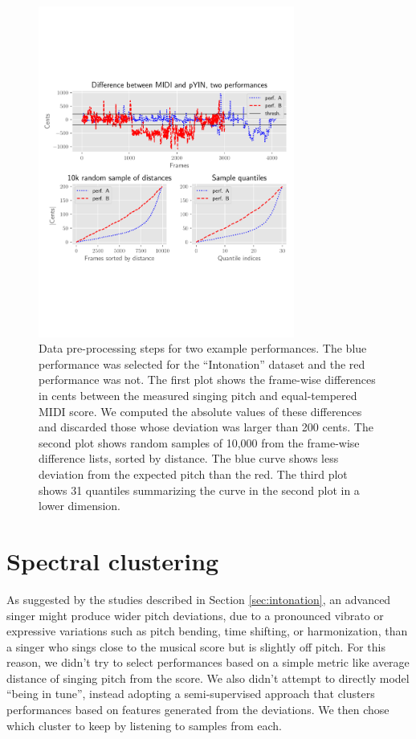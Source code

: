 \begin{appendices}
\begin{figure}[h!]
    \centering
    \includegraphics[width=0.75\textwidth]{figures/data_processing_pipeline.pdf}\vspace{-1in}
    \caption{Data pre-processing steps for two example performances. The blue performance was selected for the ``Intonation'' dataset and the red performance was not. The first plot shows the frame-wise differences in cents between the measured singing pitch and equal-tempered MIDI score. We computed the absolute values of these differences and discarded those whose deviation was larger than 200 cents. The second plot shows random samples of 10,000 from the frame-wise difference lists, sorted by distance. The blue curve shows less deviation from the expected pitch than the red. The third plot shows 31 quantiles summarizing the curve in the second plot in a lower dimension.}
    \label{fig:pipeline}
\end{figure}
\section{Spectral clustering}
As suggested by the studies described in Section \ref{sec:intonation}, an advanced singer might produce wider pitch deviations, due to a pronounced vibrato or expressive variations such as pitch bending, time shifting, or harmonization, than a singer who sings close to the musical score but is slightly off pitch. For this reason, we didn't try to select performances based on a simple metric like average distance of singing pitch from the score. We also didn't attempt to directly model ``being in tune'', instead adopting a semi-supervised approach that clusters performances based on features generated from the deviations. We then chose which cluster to keep by listening to samples from each.


\end{appendices}
